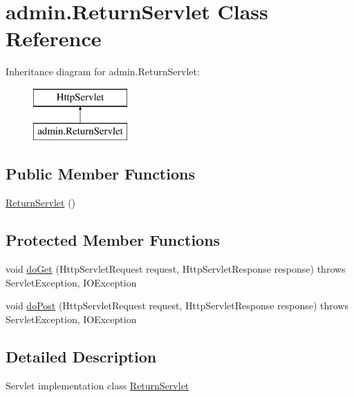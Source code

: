\hypertarget{classadmin_1_1_return_servlet}{}\section{admin.\+Return\+Servlet Class Reference}
\label{classadmin_1_1_return_servlet}
Inheritance diagram for admin.\+Return\+Servlet\+:\begin{figure}[H]
\begin{center}
\leavevmode
\includegraphics[height=2.000000cm]{classadmin_1_1_return_servlet}
\end{center}
\end{figure}
\subsection*{Public Member Functions}
\begin{DoxyCompactItemize}
\item 
\hyperlink{classadmin_1_1_return_servlet_a855b49f16845178a877261f45279927c}{Return\+Servlet} ()
\end{DoxyCompactItemize}
\subsection*{Protected Member Functions}
\begin{DoxyCompactItemize}
\item 
void \hyperlink{classadmin_1_1_return_servlet_a05243ac40e544c80bebc6ccc3af310e3}{do\+Get} (Http\+Servlet\+Request request, Http\+Servlet\+Response response)  throws Servlet\+Exception, I\+O\+Exception 
\item 
void \hyperlink{classadmin_1_1_return_servlet_af2c1e5273df5b6516d9e5f2c61b26eff}{do\+Post} (Http\+Servlet\+Request request, Http\+Servlet\+Response response)  throws Servlet\+Exception, I\+O\+Exception 
\end{DoxyCompactItemize}


\subsection{Detailed Description}
Servlet implementation class \hyperlink{classadmin_1_1_return_servlet}{Return\+Servlet} 

